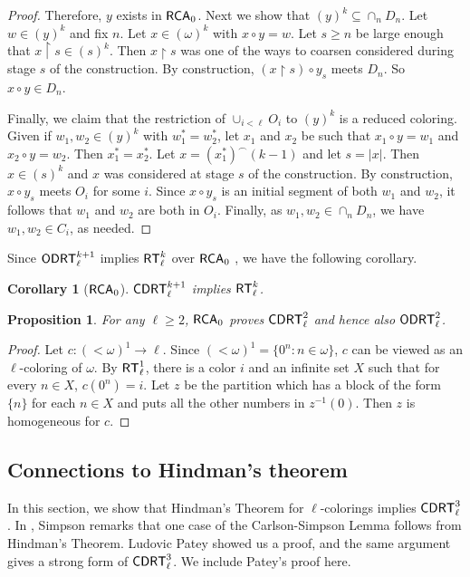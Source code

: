 \documentclass{amsart}
\newtheorem{prop}[thm]{Proposition}
\newtheorem{cor}[thm]{Corollary}
\theoremstyle{definition}
\theoremstyle{remark}
\newcommand{\system}[1]{\mbox{\fontfamily{cmss}\fontshape{n}\fontseries{m}%
    \selectfont#1}}
\newcommand{\RCA}{\system{RCA}\ensuremath{_0}}
\newcommand{\RT}{\system{RT}}
\newcommand{\CDRT}{\system{CDRT}}
\newcommand{\cDRT}{\system{CDRT}}
\newcommand{\ODRT}{\system{ODRT}}
\newcommand{\restrict}{\upharpoonright}
\newcommand{\concat}{^\smallfrown}
\newcommand{\block}[2]{{#1}^{-1}(#2)}
\begin{document}
\begin{proof}
Therefore, $y$ exists in $\RCA$.  Next we show 
that $(y)^k\subseteq \cap_n D_n$.
Let $w \in (y)^k$ and fix $n$.  Let $x \in (\omega)^k$ with $x\circ y = w$.
Let $s\geq n$ be large enough that 
$x\restrict s \in (s)^k$.  Then $x \restrict s$ was one of the ways to coarsen
considered during stage $s$ of the construction.  By construction,
$(x \restrict s) \circ y_{s}$ 
meets $D_n$.  So $x\circ y\in D_n$.

Finally, we claim that the restriction of $\cup_{i<\ell} O_i$
to $(y)^k$ is a reduced coloring.  Given
if $w_1,w_2 \in (y)^k$ with $w_1^\ast=w_2^\ast$, 
let $x_1$ and $x_2$
be such that $x_1\circ y = w_1$ and $x_2\circ y = w_2$.  
Then $x_1^\ast = x_2^\ast$.
Let $x=(x_1^\ast)\concat(k-1)$
and let $s = |x|$.  Then $x \in (s)^k$ and $x$ was considered 
at stage $s$ of the construction.  By construction,
$x \circ y_s$ meets $O_i$ for some $i$.  Since $x \circ y_s$
is an initial segment of both $w_1$ and $w_2$, it follows that 
$w_1$ and $w_2$ are both in $O_i$.  Finally, as $w_1,w_2 \in \cap_n D_n$,
we have $w_1,w_2 \in C_i$, as needed.
\end{proof}

Since $\ODRT^{k+1}_\ell$ implies $\RT^k_\ell$ over $\RCA$ \cite{ms}, we have the following corollary.

\begin{cor}[$\RCA$]
\label{cor:2.6}
$\cDRT^{k+1}_\ell$ implies $\RT^k_\ell$.
\end{cor}

\begin{prop}
\label{prop:2ll_computable}
For any $\ell \geq 2$, $\RCA$ proves $\cDRT^2_\ell$ and hence also $\ODRT^2_{\ell}$. 
\end{prop}
\begin{proof} 
Let $c: (<\omega)^1 \rightarrow \ell$. Since $(<\omega)^1 = \{ 0^n : n \in \omega \}$, 
$c$ can be viewed as an $\ell$-coloring of $\omega$.  By
$\RT^1_\ell$, there is a color $i$ and an infinite set $X$
such that for every $n \in X$, $c(0^n) = i$.  Let $z$ be the partition
which has a block of the form $\{n\}$ for each $n \in X$ and puts all
the other numbers in $\block{z}{0}$. Then $z$ is homogeneous for $c$. 
\end{proof}


\subsection{Connections to Hindman's theorem}
\label{subsec:Hindman}

In this section, we show that Hindman's Theorem for $\ell$-colorings implies
$\CDRT^3_\ell$.  In \cite{cs}, Simpson remarks that 
one case of the Carlson-Simpson Lemma follows from 
Hindman's Theorem.  Ludovic Patey showed us a proof, and the 
same argument gives a strong form of $\CDRT^3_\ell$.  We 
include Patey's proof here.
\end{document}
